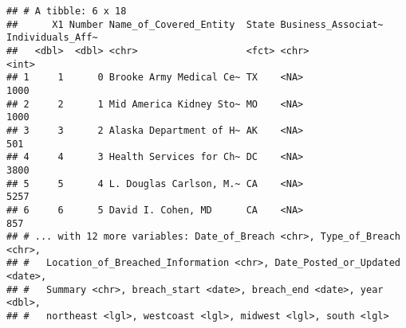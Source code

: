 \documentclass[
]{article}
\newenvironment{Shaded}{\begin{snugshade}}{\end{snugshade}}
\newcommand{\AttributeTok}[1]{\textcolor[rgb]{0.77,0.63,0.00}{#1}}
\newcommand{\ConstantTok}[1]{\textcolor[rgb]{0.00,0.00,0.00}{#1}}
\newcommand{\ControlFlowTok}[1]{\textcolor[rgb]{0.13,0.29,0.53}{\textbf{#1}}}
\newcommand{\FunctionTok}[1]{\textcolor[rgb]{0.00,0.00,0.00}{#1}}
\newcommand{\NormalTok}[1]{#1}
\newcommand{\OtherTok}[1]{\textcolor[rgb]{0.56,0.35,0.01}{#1}}
\newcommand{\SpecialCharTok}[1]{\textcolor[rgb]{0.00,0.00,0.00}{#1}}
\newcommand{\StringTok}[1]{\textcolor[rgb]{0.31,0.60,0.02}{#1}}
\begin{document}
\begin{verbatim}
## # A tibble: 6 x 18
##      X1 Number Name_of_Covered_Entity  State Business_Associat~ Individuals_Aff~
##   <dbl>  <dbl> <chr>                   <fct> <chr>                         <int>
## 1     1      0 Brooke Army Medical Ce~ TX    <NA>                           1000
## 2     2      1 Mid America Kidney Sto~ MO    <NA>                           1000
## 3     3      2 Alaska Department of H~ AK    <NA>                            501
## 4     4      3 Health Services for Ch~ DC    <NA>                           3800
## 5     5      4 L. Douglas Carlson, M.~ CA    <NA>                           5257
## 6     6      5 David I. Cohen, MD      CA    <NA>                            857
## # ... with 12 more variables: Date_of_Breach <chr>, Type_of_Breach <chr>,
## #   Location_of_Breached_Information <chr>, Date_Posted_or_Updated <date>,
## #   Summary <chr>, breach_start <date>, breach_end <date>, year <dbl>,
## #   northeast <lgl>, westcoast <lgl>, midwest <lgl>, south <lgl>
\end{verbatim}

\begin{Shaded}
\end{Shaded}
\end{document}
